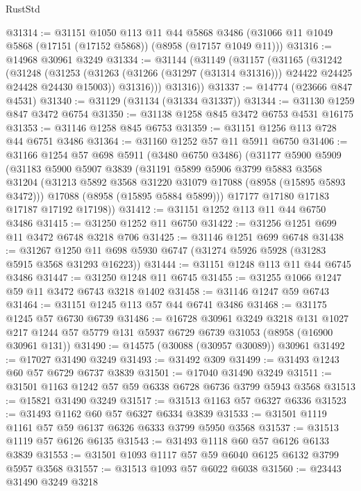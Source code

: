 \begin{lexlean}{RustStd}
\begin{coremodule}
@31314 := @31151
    @1050
    @113
    @11
    @44
    @5868
    @3486
    (@31066 @11 @1049 @5868 (@17151 (@17152 @5868)) (@8958 (@17157 @1049 @11)))
@31316 := @14968 @30961 @3249
@31334 := @31144
    (@31149
      (@31157
        (@31165
          (@31242
            (@31248
              (@31253 (@31263 (@31266 (@31297 (@31314 @31316))) @24422 @24425 @24428 @24430 @15003))
              @31316)))
        @31316))
@31337 := @14774 (@23666 @847 @4531)
@31340 := @31129 (@31134 (@31334 @31337))
@31344 := @31130 @1259 @847 @3472 @6754
@31350 := @31138 @1258 @845 @3472 @6753 @4531 @16175
@31353 := @31146 @1258 @845 @6753
@31359 := @31151 @1256 @113 @728 @44 @6751 @3486
@31364 := @31160 @1252 @57 @11 @5911 @6750
@31406 := @31166
    @1254
    @57
    @698
    @5911
    (@3480 @6750 @3486)
    (@31177
      @5900
      @5909
      (@31183
        @5900
        @5907
        @3839
        (@31191
          @5899
          @5906
          @3799
          @5883
          @3568
          @31204
          (@31213 @5892 @3568 @31220 @31079 @17088 (@8958 (@15895 @5893 @3472)))
          @17088
          (@8958 (@15895 @5884 @5899)))
        @17177
        @17180
        @17183
        @17187
        @17192
        @17198))
@31412 := @31151 @1252 @113 @11 @44 @6750 @3486
@31415 := @31250 @1252 @11 @6750
@31422 := @31256 @1251 @699 @11 @3472 @6748 @3218 @706
@31425 := @31146 @1251 @699 @6748
@31438 := @31267 @1250 @11 @698 @5930 @6747 (@31274 @5926 @5928 (@31283 @5915 @3568 @31293 @16223))
@31444 := @31151 @1248 @113 @11 @44 @6745 @3486
@31447 := @31250 @1248 @11 @6745
@31455 := @31255 @1066 @1247 @59 @11 @3472 @6743 @3218 @1402
@31458 := @31146 @1247 @59 @6743
@31464 := @31151 @1245 @113 @57 @44 @6741 @3486
@31468 := @31175 @1245 @57 @6730 @6739
@31486 := @16728
    @30961
    @3249
    @3218
    @131
    @1027
    @217
    @1244
    @57
    @5779
    @131
    @5937
    @6729
    @6739
    @31053
    (@8958 (@16900 @30961 @131))
@31490 := @14575 (@30088 (@30957 @30089)) @30961
@31492 := @17027 @31490 @3249
@31493 := @31492 @309
@31499 := @31493 @1243 @60 @57 @6729 @6737 @3839
@31501 := @17040 @31490 @3249
@31511 := @31501 @1163 @1242 @57 @59 @6338 @6728 @6736 @3799 @5943 @3568
@31513 := @15821 @31490 @3249
@31517 := @31513 @1163 @57 @6327 @6336
@31523 := @31493 @1162 @60 @57 @6327 @6334 @3839
@31533 := @31501 @1119 @1161 @57 @59 @6137 @6326 @6333 @3799 @5950 @3568
@31537 := @31513 @1119 @57 @6126 @6135
@31543 := @31493 @1118 @60 @57 @6126 @6133 @3839
@31553 := @31501 @1093 @1117 @57 @59 @6040 @6125 @6132 @3799 @5957 @3568
@31557 := @31513 @1093 @57 @6022 @6038
@31560 := @23443 @31490 @3249 @3218

\end{coremodule}
\end{lexlean}

